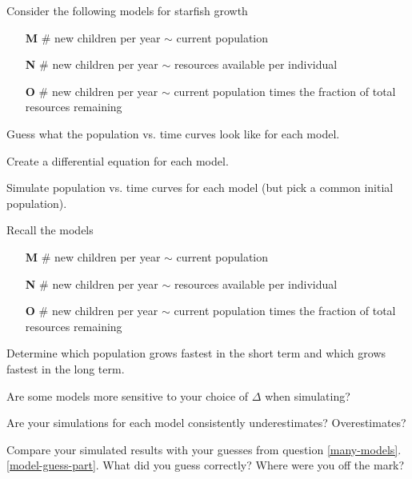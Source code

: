 \documentclass{workbook}
\begin{document}
\begin{slide}
	\question
	\label{many-models}
	Consider the following models for starfish growth
	\begin{itemize}
		\item[\textbf{M}] \# new children per year $\sim$ current population
		\item[\textbf{N}] \# new children per year $\sim$ resources available per individual
		\item[\textbf{O}] \# new children per year $\sim$ current population times the fraction of total resources remaining
	\end{itemize}

	\begin{parts}
		\item Guess what the population vs. time curves look like for each model. \label{model-guess-part}
		\item Create a differential equation for each model.
		\item Simulate population vs. time curves for each model (but pick a common initial population).
	\end{parts}
\end{slide}

\begin{slide}
	\question
	Recall the models
	\begin{itemize}
		\item[\textbf{M}] \# new children per year $\sim$ current population
		\item[\textbf{N}] \# new children per year $\sim$ resources available per individual
		\item[\textbf{O}] \# new children per year $\sim$ current population times the fraction of total resources remaining
	\end{itemize}

	\begin{parts}
		\item Determine which population grows fastest in the short term and which grows fastest in the long term.
		\item Are some models more sensitive to your choice of $\Delta$ when simulating?
		\item Are your simulations for each model consistently underestimates? Overestimates?
		\item Compare your simulated results with your guesses from question \ref{many-models}.\ref{model-guess-part}.
		What did you guess correctly? Where were you off the mark?
	\end{parts}
\end{slide}
\end{document}
